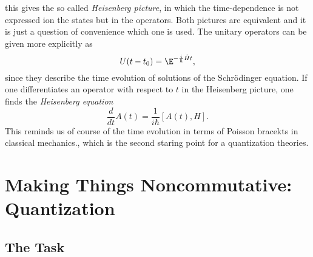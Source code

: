 this gives the so called \emph{Heisenberg picture}, in which the 
time-dependence is not expressed ion the states but in the operators. Both 
pictures are equivalent and it is just a question of convenience which one is 
used. The unitary operators can be given more explicitly as
\begin{equation*}
	U(t - t_0)
	=
	\E^{- \frac{i}{\hbar} \hat{H} t},
\end{equation*}
since they describe the time evolution of solutions of the Schr\"odinger 
equation. If one differentiates an operator with respect to $t$ in the 
Heisenberg picture, one finds the \emph{Heisenberg equation}
\begin{equation*}
	\frac{d}{dt}
	A(t)
	=
	\frac{1}{i \hbar}
	[A(t), H].
\end{equation*}
This reminds us of course of the time evolution in terms of Poisson bracekts in 
classical mechanics., which is the second staring point for a quantization 
theories.



\section{Making Things Noncommutative: Quantization}
\label{sec:chap2_Quantization}

\subsection{The Task}
\label{subsec:chap2_Task}

